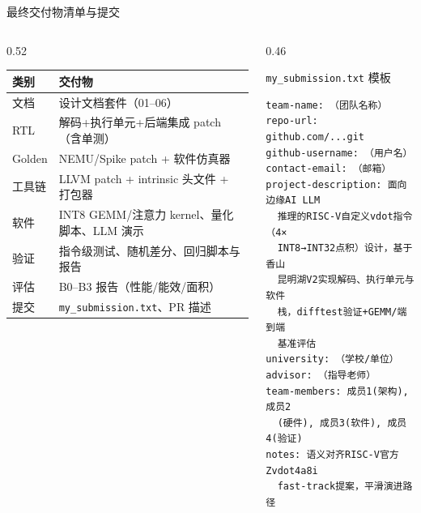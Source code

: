 \documentclass[aspectratio=169]{beamer}
\newcommand{\smalltable}[1]{\par\centering\scriptsize #1\par}
\begin{document}
\begin{frame}[fragile]{最终交付物清单与提交}
\begin{columns}[T]
\begin{column}{0.52\textwidth}
\smalltable{%
\begin{tabular}{@{}ll@{}}
\toprule
类别 & 交付物 \\
\midrule
文档 & 设计文档套件（01–06）\\
RTL & 解码+执行单元+后端集成 patch（含单测）\\
Golden & NEMU/Spike patch + 软件仿真器\\
工具链 & LLVM patch + intrinsic 头文件 + 打包器\\
软件 & INT8 GEMM/注意力 kernel、量化脚本、LLM 演示\\
验证 & 指令级测试、随机差分、回归脚本与报告\\
评估 & B0–B3 报告（性能/能效/面积）\\
提交 & \texttt{my\_submission.txt}、PR 描述\\
\bottomrule
\end{tabular}}
\end{column}
\begin{column}{0.46\textwidth}
\begin{block}{\texttt{my\_submission.txt} 模板}
\footnotesize
\begin{verbatim}
team-name: （团队名称）
repo-url: github.com/...git
github-username: （用户名）
contact-email: （邮箱）
project-description: 面向边缘AI LLM
  推理的RISC-V自定义vdot指令（4×
  INT8→INT32点积）设计，基于香山
  昆明湖V2实现解码、执行单元与软件
  栈，difftest验证+GEMM/端到端
  基准评估
university: （学校/单位）
advisor: （指导老师）
team-members: 成员1(架构), 成员2
  (硬件), 成员3(软件), 成员4(验证)
notes: 语义对齐RISC-V官方Zvdot4a8i
  fast-track提案，平滑演进路径
\end{verbatim}
\end{block}
\end{column}
\end{columns}
\end{frame}
\end{document}
